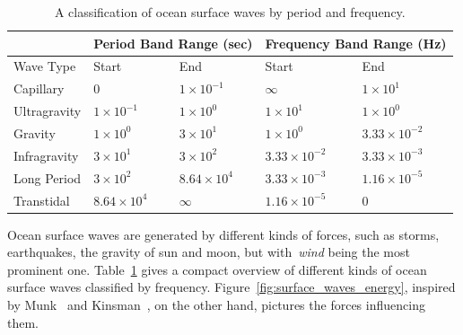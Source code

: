 \newcommand{\mvec}[1]{\mathbf{#1}}
\newcommand{\mvecx}[1]{\mathbf{#1}_x}
\newcommand{\mvecy}[1]{\mathbf{#1}_y}
\newcommand{\mvecz}[1]{\mathbf{#1}_z}
\newcommand{\mvecw}[1]{\mathbf{#1}_w}
\newcommand{\mmat}[1]{\mathbf{#1}}
\newcommand{\transpose}[1]{#1^{\mathsf{T}}}
\newcommand{\inverse}[1]{#1^{\mathsf{-1}}}
\newcommand{\normalise}[1]{\frac{#1}{\norm{#1}}}

\DeclarePairedDelimiter\abs{\lvert}{\rvert}
\DeclarePairedDelimiter\norm{\lVert}{\rVert}


\renewcommand{\Re}{\mathcal{R}}
\renewcommand{\Im}{\mathcal{I}} 

\begin{table}[b]
\begin{tabularx}{\textwidth}{X | X X | X X }
  \cline{2-5}
  & \multicolumn{2}{c}{Period Band Range (sec)} \vline & \multicolumn{2}{c}{Frequency Band Range (Hz)} \\
  \hline
  Wave Type & Start & End & Start & End \\
 \hline
  Capillary    & $0$                & $1\times10^{-1}$   & $\infty$            & $1\times10^1$ \\
  Ultragravity & $1\times10^{-1}$   & $1\times10^{0}$    & $1\times10^1$       & $1\times10^0$ \\
  Gravity      & $1\times10^{0}$    & $3\times10^{1}$    & $1\times10^0$       & $3.33\times10^{-2}$ \\
  Infragravity & $3\times10^{1}$    & $3\times10^{2}$    & $3.33\times10^{-2}$ & $3.33\times10^{-3}$ \\
  Long Period  & $3\times10^{2}$    & $8.64\times10^{4}$ & $3.33\times10^{-3}$ & $1.16\times10^{-5}$ \\
  Transtidal   & $8.64\times10^{4}$ & $\infty$           & $1.16\times10^{-5}$ & $0$
\end{tabularx}
\caption{A classification of ocean surface waves by period and frequency.}
\label{tab:ocean_wave_period}
\end{table}

Ocean surface waves are generated by different kinds of forces, such as storms, earthquakes,
the gravity of sun and moon, but with~\emph{wind} being the most prominent one.
Table~\ref{tab:ocean_wave_period} gives a compact overview of different kinds of ocean surface waves
classified by frequency. Figure~\ref{fig:surface_waves_energy}, inspired by Munk~\cite{article:munkorigin}
and Kinsman~\cite{book:kinsman2002wind}, on the other hand, pictures the forces
influencing them.\\

